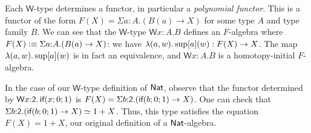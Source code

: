 \documentclass[11pt]{article}
\newcommand*{\Bool}{\mathsf{2}}
\newcommand*{\W}{\mathsf{W}}
\begin{document}
Each $\W$-type determines a functor, in particular a \emph{polynomial functor}. This is a functor of the form $F(X) = \Sigma a{:}A. (B(a) \to X)$ for some type $A$ and type family $B$. We can see that the $\W$-type $\W x{:}A.B$ defines an $F$-algebra where $F(X) \vcentcolon\equiv \Sigma a{:}A. (B(a) \to X)$: we have $\lambda (a,w). \sup[a](w) : F(X) \to X$. The map $\lambda (a,w). \sup[a](w)$ is in fact an equivalence, and $\W x{:}A.B$ is a homotopy-initial $F$-algebra.

In the case of our $\W$-type definition of $\mathsf{Nat}$, observe that the functor determined by $\W x{:}\Bool. \caseif(x;0;1)$ is $F(X) = \Sigma b{:}\Bool. (\caseif(b;0;1) \to X)$. One can check that $\Sigma b{:}\Bool. (\caseif(b;0;1) \to X) \simeq 1 + X$. Thus, this type satisfies the equation $F(X) = 1 + X$, our original definition of a $\mathsf{Nat}$-algebra.



\end{document}
